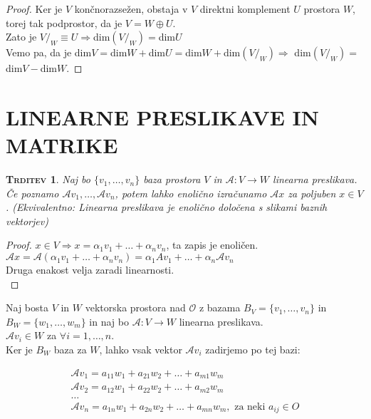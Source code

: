 \documentclass[a4paper,12pt]{article}
\newcommand{\A}{\mathcal{A}}
\newtheorem*{trditev}{\textsc{Trditev}}
\begin{document}
\begin{proof}
	Ker je $V$ končnorazsežen, obstaja v $V$ direktni komplement $U$ prostora $W$, torej tak podprostor, da je $V=W\oplus U$. \\

	Zato je $V/_W\equiv U\Rightarrow$dim$(V/_W)=$dim$U$ \\

	Vemo pa, da je dim$V=$dim$W+$dim$U=$dim$W+$dim$(V/_W) \Rightarrow$ dim$(V/_W)=$dim$V-$dim$W$.
\end{proof}

\newpage

\section{LINEARNE PRESLIKAVE IN MATRIKE}

\begin{trditev}
	Naj bo $\{v_1,\ldots,v_n\}$ baza prostora $V$ in $\A :V\to W$ linearna preslikava. Če poznamo $\A v_1,\ldots,\A v_n$, potem lahko enolično izračunamo $\A x$ za poljuben $x\in V$. (Ekvivalentno: Linearna preslikava je enolično določena s slikami baznih vektorjev)\\
\end{trditev}

\begin{proof}
	$x\in V \Rightarrow x=\alpha_1 v_1+\ldots+\alpha_n v_n$, ta zapis je enoličen.\\

	$\A x=\A (\alpha_1 v_1+\ldots+\alpha_n v_n)=\alpha_1 Av_1+\ldots+\alpha_n \A v_n$ \\

	Druga enakost velja zaradi linearnosti.\\
\end{proof}

Naj bosta $V$ in $W$ vektorska prostora nad $\mathcal{O}$ z bazama $B_V=\{v_1,\ldots,v_n\}$ in \linebreak $B_W=\{w_1,\ldots,w_m\}$ in naj bo $\A :V\to W$ linearna preslikava. \\

$\A v_i\in W$ za $\forall i =1,\ldots,n$. \\

Ker je $B_W$ baza za $W$, lahko vsak vektor $\A v_i$ zadirjemo po tej  bazi:

\begin{gather*}
	\A v_1=a_{11}w_1+a_{21}w_2+\ldots+a_{m1}w_m \\
	\A v_2=a_{12}w_1+a_{22}w_2+\ldots+a_{m2}w_m \\
	\ldots \\
	\A v_n=a_{1n}w_1+a_{2n}w_2+\ldots+a_{mn}w_m,\text{ za neki }a_{ij}\in O
\end{gather*}
\end{document}
